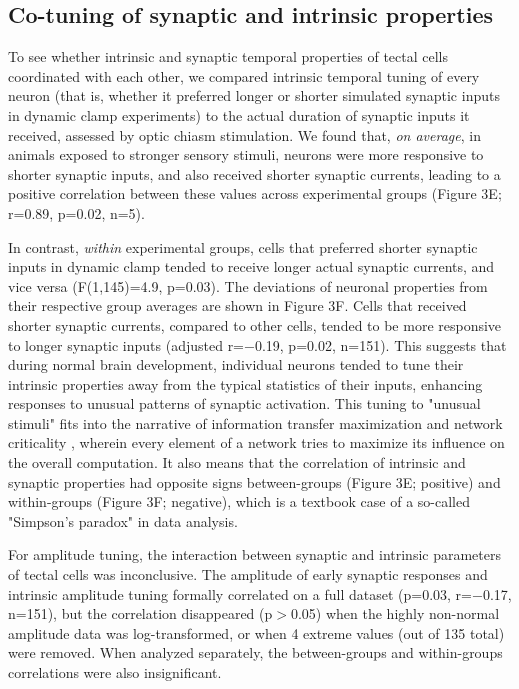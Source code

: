 \documentclass{article}
\begin{document}
\subsection*{Co-tuning of synaptic and intrinsic properties}

To see whether intrinsic and synaptic temporal properties of tectal cells coordinated with each other, we compared intrinsic temporal tuning of every neuron (that is, whether it preferred longer or shorter simulated synaptic inputs in dynamic clamp experiments) to the actual duration of synaptic inputs it received, assessed by optic chiasm stimulation. We found that, \textit{on average}, in animals exposed to stronger sensory stimuli, neurons were more responsive to shorter synaptic inputs, and also received shorter synaptic currents, leading to a positive correlation between these values across experimental groups (Figure 3E; r=0.89, p=0.02, n=5).

In contrast, \textit{within} experimental groups, cells that preferred shorter synaptic inputs in dynamic clamp tended to receive longer actual synaptic currents, and vice versa (F(1,145)=4.9, p=0.03). The deviations of neuronal properties from their respective group averages are shown in Figure 3F. Cells that received shorter synaptic currents, compared to other cells, tended to be more responsive to longer synaptic inputs (adjusted r=$-$0.19, p=0.02, n=151). This suggests that during normal brain development, individual neurons tended to tune their intrinsic properties away from the typical statistics of their inputs, enhancing responses to unusual patterns of synaptic activation. This tuning to "unusual stimuli" fits into the narrative of information transfer maximization \citep{stemmler1999information, brenner2000} and network criticality \citep{rubinov2011}, wherein every element of a network tries to maximize its influence on the overall computation. It also means that the correlation of intrinsic and synaptic properties had opposite signs between-groups (Figure 3E; positive) and within-groups (Figure 3F; negative), which is a textbook case of a so-called "Simpson's paradox" in data analysis.

For amplitude tuning, the interaction between synaptic and intrinsic parameters of tectal cells was inconclusive. The amplitude of early synaptic responses and intrinsic amplitude tuning formally correlated on a full dataset (p=0.03, r=$-$0.17, n=151), but the correlation disappeared (p$>$0.05) when the highly non-normal amplitude data was log-transformed, or when 4 extreme values (out of 135 total) were removed. When analyzed separately, the between-groups and within-groups correlations were also insignificant.
\end{document}
